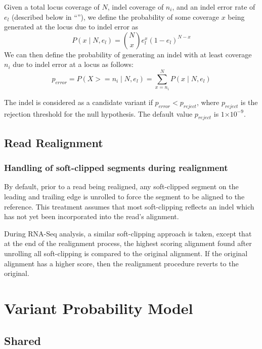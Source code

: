 \documentclass{article}
\newcommand{\e}[1]{\ensuremath{\times 10^{#1}}}
\begin{document}
Given a total locus coverage of $N$, indel coverage of $n_i$, and an indel error rate of $e_l$ (described below in ``''), we define the probability of some coverage $x$ being generated at the locus due to indel error as
\begin{equation*}
P(x \mid N, e_l) = \binom {N} {x} e^{x}_l (1 - e_l)^{N - x}
\end{equation*}
We can then define the probability of generating an indel with at least coverage $n_i$ due to indel error at a locus as follows:
\begin{equation*}
p_{error} = P(X >= n_i \mid N, e_l) = \sum_{x = n_i}^{N} P(x \mid N, e_l)
\end{equation*}

\noindent The indel is considered as a candidate variant if $p_{error} < p_{reject}$, where $p_{reject}$ is the rejection threshold for the null hypothesis. The default value $p_{reject}$ is $1\e{-9}$.


\subsection{Read Realignment}

\subsubsection{Handling of soft-clipped segments during realignment}

By default, prior to a read being realigned, any soft-clipped segment on the leading and trailing edge is unrolled to force the segment to be aligned to the reference. This treatment assumes that most soft-clipping reflects an indel which has not yet been incorporated into the read's alignment.

During RNA-Seq analysis, a similar soft-clipping approach is taken, except that at the end of the realignment process, the highest scoring alignment found after unrolling all soft-clipping is compared to the original alignment. If the original alignment has a higher score, then the realignment procedure reverts to the original.



\section{Variant Probability Model}


\subsection{Shared}
\end{document}
